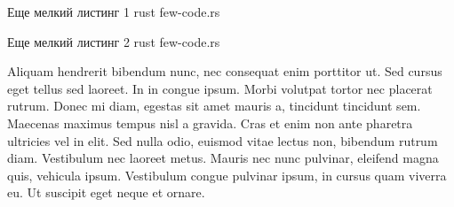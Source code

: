 \fixedlisting
    {Еще мелкий листинг 1}
    {rust}
    {few-code.rs}

\fixedlisting
    {Еще мелкий листинг 2}
    {rust}
    {few-code.rs}

Aliquam hendrerit bibendum nunc, nec consequat enim porttitor ut. Sed cursus eget tellus sed laoreet. In in congue ipsum. Morbi volutpat tortor nec placerat rutrum. Donec mi diam, egestas sit amet mauris a, tincidunt tincidunt sem. Maecenas maximus tempus nisl a gravida. Cras et enim non ante pharetra ultricies vel in elit. Sed nulla odio, euismod vitae lectus non, bibendum rutrum diam. Vestibulum nec laoreet metus. Mauris nec nunc pulvinar, eleifend magna quis, vehicula ipsum. Vestibulum congue pulvinar ipsum, in cursus quam viverra eu. Ut suscipit eget neque et ornare.
